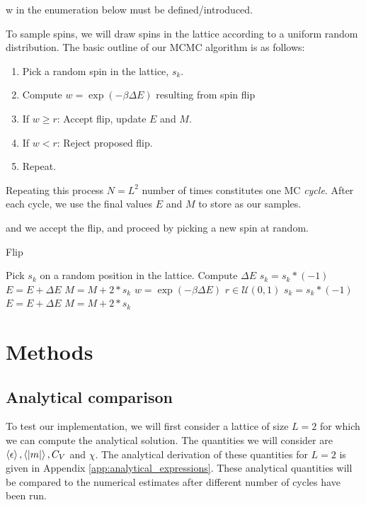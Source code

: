 \alert{w in the enumeration below must be defined/introduced.}

To sample spins, we will draw spins in the lattice according to a uniform random distribution. The basic outline of our MCMC algorithm is as follows:
\begin{enumerate}
    \item Pick a random spin in the lattice, $s_k$.
    \item Compute $w=\exp(-\beta \Delta E)$ resulting from spin flip  
    \item If $w \geq r$: Accept flip, update $E$ and $M$. 
    \item If $w<r$: Reject proposed flip.
    \item Repeat.   
\end{enumerate} 
Repeating this process $N=L^2$ number of times constitutes one MC \textit{cycle}. After each cycle, we use the final values $E$ and $M$ to store as our samples. 

and we accept the flip, and proceed by picking a new spin at random.   

\begin{algorithm}[H]
    \caption{Flip}\label{algo:flip}
    \begin{algorithmic}
        \State Pick $s_k$ on a random position in the lattice.
        \State Compute $\Delta E$
            \State $s_k = s_k * (-1)$
            \State $E = E + \Delta E$
            \State $M = M + 2 * s_k$
        \Else
            \State $w=\exp(-\beta \Delta E)$
            \State $r\in\mathcal{U}(0,1)$
                \State $s_k = s_k * (-1)$
                \State $E = E + \Delta E$
                \State $M = M + 2 * s_k$
            \EndIf
        \EndIf
    \end{algorithmic}
\end{algorithm}



\section{Methods}\label{sec:methods}

\subsection{Analytical comparison}\label{subsec_methods:analytical_test}
To test our implementation, we will first consider a lattice of size $L=2$ for which we can compute the analytical solution. The quantities we will consider are $\expval{\epsilon},\expval{\abs{m}},C_V$ and $\chi$. The analytical derivation of these quantities for $L=2$ is given in Appendix \ref{app:analytical_expressions}. These analytical quantities will be compared to the numerical estimates after different number of cycles have been run. 


